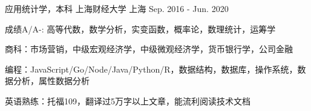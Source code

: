 

\begin{cventries}

  \cventry
    {应用统计学，本科} %
    {上海财经大学} %
    {上海} %
    {Sep. 2016 - Jun. 2020} %
    {
      \begin{cvitems} %
\item {成绩A/A-:   高等代数，数学分析，实变函数，概率论，数理统计，运筹学}
        \item {商科：市场营销，中级宏观经济学，中级微观经济学，货币银行学，公司金融}
        \item {编程：JavaScript/Go/Node/Java/Python/R，数据结构，数据库，操作系统，数据分析，属性数据分析}
        \item {英语熟练：托福109，翻译过5万字以上文章，能流利阅读技术文档}
      \end{cvitems}
    }

\end{cventries}


